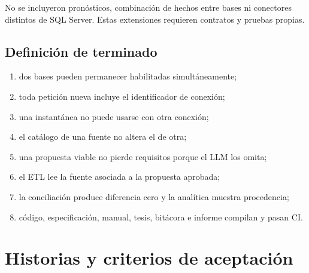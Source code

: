 \documentclass[11pt,letterpaper]{article}
\begin{document}
No se incluyeron pronósticos, combinación de hechos entre bases ni conectores distintos de
SQL Server. Estas extensiones requieren contratos y pruebas propias.

\subsection{Definición de terminado}

\begin{enumerate}
  \item dos bases pueden permanecer habilitadas simultáneamente;
  \item toda petición nueva incluye el identificador de conexión;
  \item una instantánea no puede usarse con otra conexión;
  \item el catálogo de una fuente no altera el de otra;
  \item una propuesta viable no pierde requisitos porque el LLM los omita;
  \item el ETL lee la fuente asociada a la propuesta aprobada;
  \item la conciliación produce diferencia cero y la analítica muestra procedencia;
  \item código, especificación, manual, tesis, bitácora e informe compilan y pasan CI.
\end{enumerate}

\section{Historias y criterios de aceptación}
\end{document}
